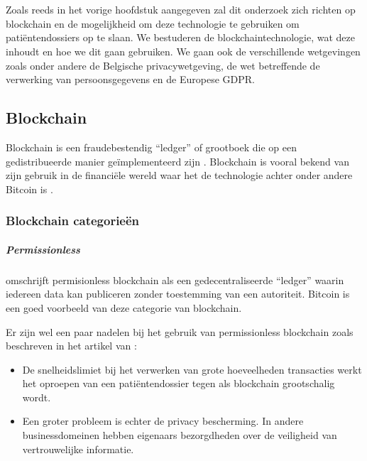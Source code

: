 \chapter{}
\label{ch:stand-van-zaken}

Zoals reeds in het vorige hoofdstuk aangegeven zal dit onderzoek zich richten op blockchain en de mogelijkheid om deze technologie te gebruiken om patiëntendossiers op te slaan. We bestuderen de blockchaintechnologie, wat deze inhoudt en hoe we dit gaan gebruiken. We gaan ook de verschillende wetgevingen zoals onder andere de Belgische privacywetgeving, de wet betreffende de verwerking van persoonsgegevens en de Europese GDPR.
\section{Blockchain}
\label{ch:blockchain}

Blockchain is een fraudebestendig ``ledger'' of grootboek die op een gedistribueerde manier geïmplementeerd zijn \autocite{Yaga2018}. Blockchain is vooral bekend van zijn gebruik in de financiële wereld waar het de technologie achter onder andere Bitcoin is \autocite{Nofer2017}. 

\subsection{Blockchain categorieën}

\paragraph{Permissionless}

\textcite{Yaga2018} omschrijft permisionless blockchain als een gedecentraliseerde ``ledger'' waarin iedereen data kan publiceren zonder toestemming van een autoriteit. Bitcoin is een goed voorbeeld van deze categorie van blockchain.

Er zijn wel een paar nadelen bij het gebruik van permissionless blockchain zoals beschreven in het artikel van \textcite{Liu}:
\begin{itemize}
    \item De snelheidslimiet bij het verwerken van grote hoeveelheden transacties werkt het oproepen van een patiëntendossier tegen als blockchain grootschalig wordt.
    \item Een groter probleem is echter de privacy bescherming. In andere businessdomeinen hebben eigenaars bezorgdheden over de veiligheid van vertrouwelijke informatie.
\end{itemize}


